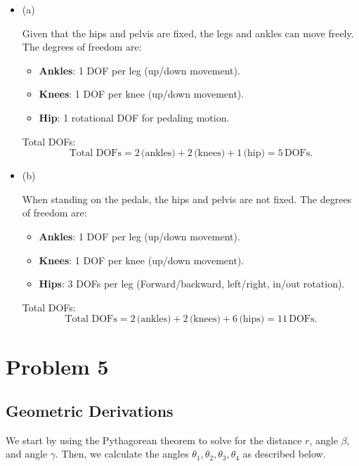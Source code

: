 \documentclass[12pt]{article}
\begin{document}
\begin{itemize}
    \item (a)
    
    Given that the hips and pelvis are fixed, the legs and ankles can move freely. The degrees of freedom are:

    \begin{itemize}
        \item \textbf{Ankles}: 1 DOF per leg (up/down movement).
        \item \textbf{Knees}: 1 DOF per knee (up/down movement).
        \item \textbf{Hip}: 1 rotational DOF for pedaling motion.
    \end{itemize}
    
    Total DOFs:
    \[
    \text{Total DOFs} = 2 \, \text{(ankles)} + 2 \, \text{(knees)} + 1 \, \text{(hip)} = 5 \, \text{DOFs}.
    \]
    

    \item (b)
    
    When standing on the pedals, the hips and pelvis are not fixed. The degrees of freedom are:

    \begin{itemize}
        \item \textbf{Ankles}: 1 DOF per leg (up/down movement).
        \item \textbf{Knees}: 1 DOF per knee (up/down movement).
        \item \textbf{Hips}: 3 DOFs per leg (Forward/backward, left/right, in/out rotation).
    \end{itemize}
    
    Total DOFs:
    \[
    \text{Total DOFs} = 2 \, \text{(ankles)} + 2 \, \text{(knees)} + 6 \, \text{(hips)} = 11 \, \text{DOFs}.
    \]

\end{itemize}



\section{Problem 5}
\subsection*{Geometric Derivations}

We start by using the Pythagorean theorem to solve for the distance \( r \), angle \( \beta \), and angle \( \gamma \). Then, we calculate the angles \( \theta_1, \theta_2, \theta_3, \theta_4 \) as described below.
\end{document}
